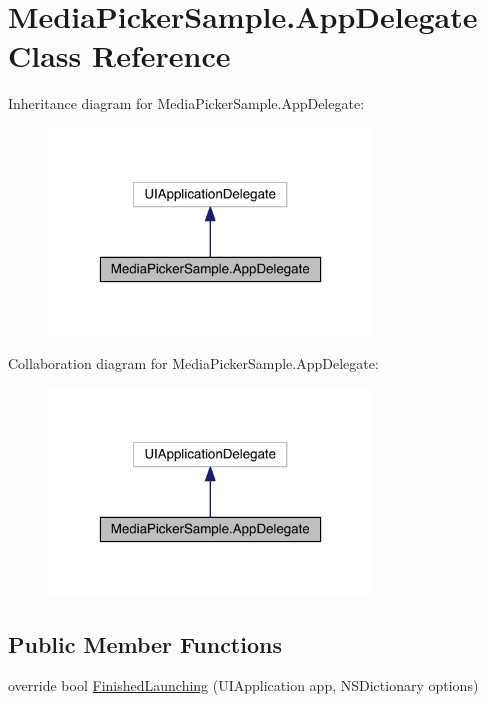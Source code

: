\hypertarget{class_media_picker_sample_1_1_app_delegate}{\section{Media\+Picker\+Sample.\+App\+Delegate Class Reference}
\label{class_media_picker_sample_1_1_app_delegate}
}


Inheritance diagram for Media\+Picker\+Sample.\+App\+Delegate\+:
\nopagebreak
\begin{figure}[H]
\begin{center}
\leavevmode
\includegraphics[width=244pt]{class_media_picker_sample_1_1_app_delegate__inherit__graph}
\end{center}
\end{figure}


Collaboration diagram for Media\+Picker\+Sample.\+App\+Delegate\+:
\nopagebreak
\begin{figure}[H]
\begin{center}
\leavevmode
\includegraphics[width=244pt]{class_media_picker_sample_1_1_app_delegate__coll__graph}
\end{center}
\end{figure}
\subsection*{Public Member Functions}
\begin{DoxyCompactItemize}
\item 
override bool \hyperlink{class_media_picker_sample_1_1_app_delegate_a352f555800c8bcf2620b8724750ba4d4}{Finished\+Launching} (U\+I\+Application app, N\+S\+Dictionary options)
\end{DoxyCompactItemize}


